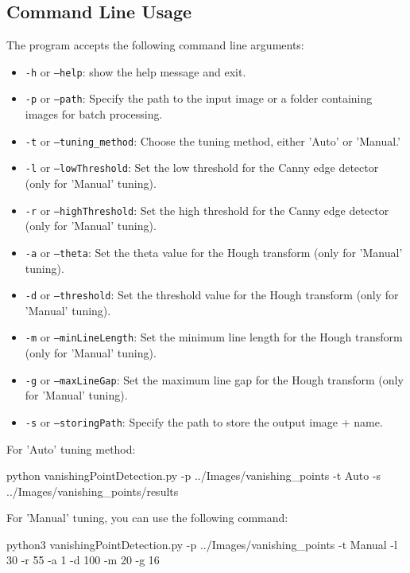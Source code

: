 \begin{multicols}{2}
\subsection{Command Line Usage}
The program accepts the following command line arguments:
\begin{itemize}
    \item \texttt{-h} or \texttt{--help}: show the help message and exit.
    \item \texttt{-p} or \texttt{--path}: Specify the path to the input image or a folder containing images for batch processing.
    \item \texttt{-t} or \texttt{--tuning\_method}: Choose the tuning method, either 'Auto' or 'Manual.'
    \item \texttt{-l} or \texttt{--lowThreshold}: Set the low threshold for the Canny edge detector (only for 'Manual' tuning).
    \item \texttt{-r} or \texttt{--highThreshold}: Set the high threshold for the Canny edge detector (only for 'Manual' tuning).
    \item \texttt{-a} or \texttt{--theta}: Set the theta value for the Hough transform (only for 'Manual' tuning).
    \item \texttt{-d} or \texttt{--threshold}: Set the threshold value for the Hough transform (only for 'Manual' tuning).
    \item \texttt{-m} or \texttt{--minLineLength}: Set the minimum line length for the Hough transform (only for 'Manual' tuning).
    \item \texttt{-g} or \texttt{--maxLineGap}: Set the maximum line gap for the Hough transform (only for 'Manual' tuning).
    \item \texttt{-s} or \texttt{--storingPath}: Specify the path to store the output image + name.
\end{itemize}
\vspace{0.2cm}
\noindent
For ’Auto’ tuning method:
\begin{bashscript}
    python vanishingPointDetection.py -p ../Images/vanishing_points  -t Auto -s ../Images/vanishing_points/results
\end{bashscript}
\vspace{0.2cm}
\noindent
For ’Manual’ tuning, you can use the following command:
\begin{bashscript}
    python3 vanishingPointDetection.py -p ../Images/vanishing_points  -t Manual -l 30 -r 55 -a 1 -d 100 -m 20 -g 16
\end{bashscript}


\end{multicols}

